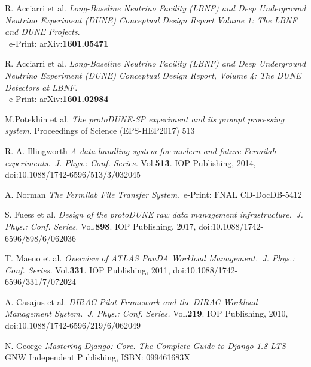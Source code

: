 \documentclass{webofc}
\begin{document}
\begin{thebibliography}{99}



R. Acciarri et al.
\emph{Long-Baseline Neutrino Facility (LBNF) and Deep Underground Neutrino Experiment (DUNE) Conceptual Design Report Volume 1: The LBNF and DUNE Projects}.\\ ~e-Print: arXiv:\textbf{1601.05471}

R. Acciarri et al.
\emph{Long-Baseline Neutrino Facility (LBNF) and Deep Underground Neutrino Experiment (DUNE) Conceptual Design Report, Volume 4: The DUNE Detectors at LBNF}.\\~e-Print: arXiv:\textbf{1601.02984}

 M.Potekhin et al. \emph{The protoDUNE-SP experiment and its prompt
processing system}. Proceedings of Science (EPS-HEP2017) 513



R. A. Illingworth \emph{A data handling system for modern and future Fermilab experiments.~J. Phys.: Conf. Series.} Vol.\textbf{513}. IOP Publishing, 2014,
doi:10.1088/1742-6596/513/3/032045

A. Norman \emph{The Fermilab File Transfer System}.~e-Print: FNAL CD-DocDB-5412

S. Fuess et al. \emph{Design of the protoDUNE raw data management
infrastructure.~J. Phys.: Conf. Series.} Vol.\textbf{898}. IOP Publishing, 2017,
doi:10.1088/1742-6596/898/6/062036


T. Maeno et al. \emph{Overview of ATLAS PanDA Workload Management.~J. Phys.: Conf. Series.} Vol.\textbf{331}. IOP Publishing, 2011,
doi:10.1088/1742-6596/331/7/072024



A. Casajus et al.  \emph{DIRAC Pilot Framework and the DIRAC
Workload Management System.~J. Phys.: Conf. Series.} Vol.\textbf{219}. IOP Publishing, 2010,
doi:10.1088/1742-6596/219/6/062049

N. George \emph{Mastering Django: Core. The Complete Guide to Django 1.8 LTS}~ GNW Independent Publishing, ISBN: 099461683X



\end{thebibliography}
\end{document}

